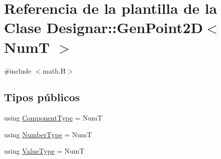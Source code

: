 \hypertarget{class_designar_1_1_gen_point2_d}{}\section{Referencia de la plantilla de la Clase Designar\+:\+:Gen\+Point2D$<$ NumT $>$}
\label{class_designar_1_1_gen_point2_d}


{\ttfamily \#include $<$math.\+H$>$}

\subsection*{Tipos públicos}
\begin{DoxyCompactItemize}
\item 
using \hyperlink{class_designar_1_1_gen_point2_d_a8d80993f38dab83a39e80a50db08b944}{Component\+Type} = NumT
\item 
using \hyperlink{class_designar_1_1_gen_point2_d_a6ad786447c17adc8cbaece7f12ac2132}{Number\+Type} = NumT
\item 
using \hyperlink{class_designar_1_1_gen_point2_d_a8f13f44ca3438223d1ecdce2728b9437}{Value\+Type} = NumT
\end{DoxyCompactItemize}
